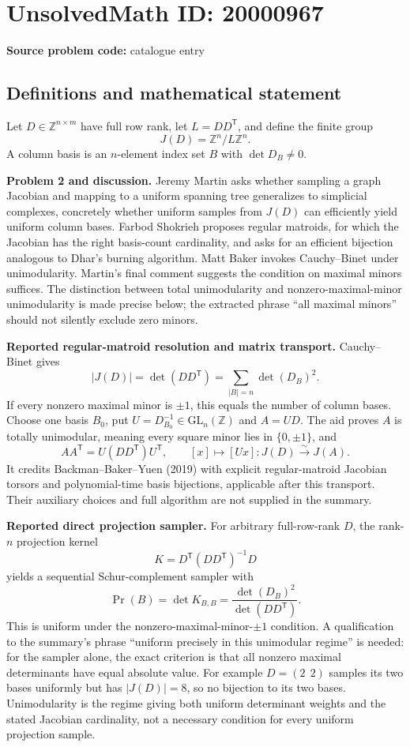 \documentclass[11pt]{article}
\newcommand{\Z}{\mathbb{Z}}
\begin{document}
\section*{UnsolvedMath ID: 20000967}
\textbf{Source problem code:} catalogue entry
\subsection{Definitions and mathematical statement}
Let $D\in\Z^{n\times m}$ have full row rank, let $L=DD^{\mathsf T}$, and define the finite group
\[
 J(D)=\Z^n/L\Z^n.
\]
A column basis is an $n$-element index set $B$ with $\det D_B\ne0$.

\textbf{Problem 2 and discussion.} Jeremy Martin asks whether sampling a graph Jacobian and mapping to a uniform spanning tree generalizes to simplicial complexes, concretely whether uniform samples from $J(D)$ can efficiently yield uniform column bases. Farbod Shokrieh proposes regular matroids, for which the Jacobian has the right basis-count cardinality, and asks for an efficient bijection analogous to Dhar's burning algorithm. Matt Baker invokes Cauchy--Binet under unimodularity. Martin's final comment suggests the condition on maximal minors suffices. The distinction between total unimodularity and nonzero-maximal-minor unimodularity is made precise below; the extracted phrase ``all maximal minors'' should not silently exclude zero minors.

\textbf{Reported regular-matroid resolution and matrix transport.} Cauchy--Binet gives
\[
 |J(D)|=\det(DD^{\mathsf T})=\sum_{|B|=n}\det(D_B)^2.
\]
If every nonzero maximal minor is $\pm1$, this equals the number of column bases. Choose one basis $B_0$, put $U=D_{B_0}^{-1}\in\mathrm{GL}_n(\Z)$ and $A=UD$. The aid proves $A$ is totally unimodular, meaning every square minor lies in $\{0,\pm1\}$, and
\[
 AA^{\mathsf T}=U(DD^{\mathsf T})U^{\mathsf T},\qquad
 [x]\longmapsto[Ux]:J(D)\xrightarrow{\sim}J(A).
\]
It credits Backman--Baker--Yuen (2019) with explicit regular-matroid Jacobian torsors and polynomial-time basis bijections, applicable after this transport. Their auxiliary choices and full algorithm are not supplied in the summary.

\textbf{Reported direct projection sampler.} For arbitrary full-row-rank $D$, the rank-$n$ projection kernel
\[
 K=D^{\mathsf T}(DD^{\mathsf T})^{-1}D
\]
yields a sequential Schur-complement sampler with
\[
 \Pr(B)=\det K_{B,B}=\frac{\det(D_B)^2}{\det(DD^{\mathsf T})}.
\]
This is uniform under the nonzero-maximal-minor-$\pm1$ condition. A qualification to the summary's phrase ``uniform precisely in this unimodular regime'' is needed: for the sampler alone, the exact criterion is that all nonzero maximal determinants have equal absolute value. For example $D=(2\ \ 2)$ samples its two bases uniformly but has $|J(D)|=8$, so no bijection to its two bases. Unimodularity is the regime giving both uniform determinant weights and the stated Jacobian cardinality, not a necessary condition for every uniform projection sample.
\end{document}
